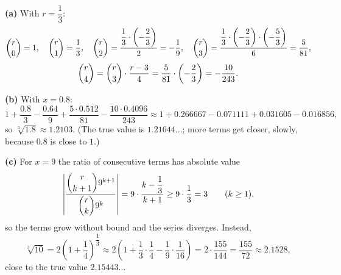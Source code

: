 \textbf{(a)} With $r=\dfrac13$:
\[\dbinom r0=1,\quad \dbinom r1=\dfrac13,\quad \dbinom r2=\dfrac{\dfrac13\cdot\left(-\dfrac23\right)}{2}=-\dfrac19,\quad \dbinom r3=\dfrac{\dfrac13\cdot\left(-\dfrac23\right)\cdot\left(-\dfrac53\right)}{6}=\dfrac5{81},\]
\[\dbinom r4=\dbinom r3\cdot\dfrac{r-3}{4}=\dfrac5{81}\cdot\left(-\dfrac23\right)=-\dfrac{10}{243}.\]

\textbf{(b)} With $x=0.8$:
\[1+\dfrac{0.8}{3}-\dfrac{0.64}{9}+\dfrac{5\cdot0.512}{81}-\dfrac{10\cdot0.4096}{243}\approx1+0.266667-0.071111+0.031605-0.016856,\]
so $\sqrt[3]{1.8}\approx\boxed{1.2103}$. (The true value is $1.21644\ldots$; more terms get closer, slowly, because $0.8$ is close to $1$.)

\textbf{(c)} For $x=9$ the ratio of consecutive terms has absolute value
\[\left|\dfrac{\dbinom r{k+1}9^{k+1}}{\dbinom rk9^k}\right|=9\cdot\dfrac{k-\dfrac13}{k+1}\ge9\cdot\dfrac13=3\qquad(k\ge1),\]
so the terms grow without bound and the series diverges. Instead,
\[\sqrt[3]{10}=2\left(1+\dfrac14\right)^{\dfrac13}\approx2\left(1+\dfrac13\cdot\dfrac14-\dfrac19\cdot\dfrac1{16}\right)=2\cdot\dfrac{155}{144}=\dfrac{155}{72}\approx\boxed{2.1528},\]
close to the true value $2.15443\ldots$
